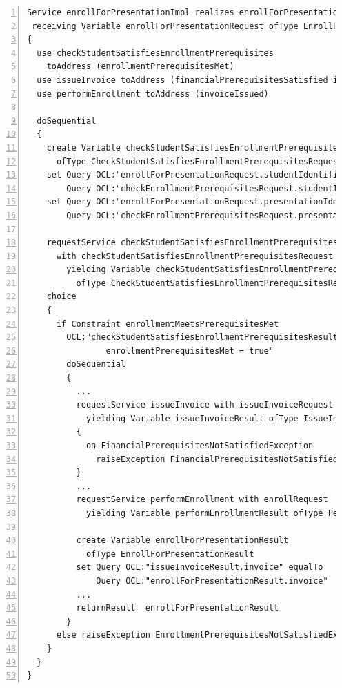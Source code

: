 \tiny \begin{lstlisting}[numbers=left,escapechar=|]
Service enrollForPresentationImpl realizes enrollForPresentation 
 receiving Variable enrollForPresentationRequest ofType EnrollForPresentationRequest
{
  use checkStudentSatisfiesEnrollmentPrerequisites 
    toAddress (enrollmentPrerequisitesMet)
  use issueInvoice toAddress (financialPrerequisitesSatisfied invoiceIssued) 
  use performEnrollment toAddress (invoiceIssued)
   
  doSequential
  {
    create Variable checkStudentSatisfiesEnrollmentPrerequisitesRequest 
      ofType CheckStudentSatisfiesEnrollmentPrerequisitesRequest               
    set Query OCL:"enrollForPresentationRequest.studentIdentifier" equalTo 
        Query OCL:"checkEnrollmentPrerequisitesRequest.studentIdentifier"
    set Query OCL:"enrollForPresentationRequest.presentationIdentifier" equalTo
        Query OCL:"checkEnrollmentPrerequisitesRequest.presentationIdentifier"
                     
    requestService checkStudentSatisfiesEnrollmentPrerequisites 
      with checkStudentSatisfiesEnrollmentPrerequisitesRequest 
        yielding Variable checkStudentSatisfiesEnrollmentPrerequisitesResult
          ofType CheckStudentSatisfiesEnrollmentPrerequisitesResult
    choice
    {
      if Constraint enrollmentMeetsPrerequisitesMet 
        OCL:"checkStudentSatisfiesEnrollmentPrerequisitesResult.
                enrollmentPrerequisitesMet = true"
        doSequential
        {
          ...
          requestService issueInvoice with issueInvoiceRequest 
            yielding Variable issueInvoiceResult ofType IssueInvoiceResult
          {
            on FinancialPrerequisitesNotSatisfiedException 
              raiseException FinancialPrerequisitesNotSatisfiedException
          }
	      ...
          requestService performEnrollment with enrollRequest 
            yielding Variable performEnrollmentResult ofType PerformEnrollmentResult
          
          create Variable enrollForPresentationResult 
            ofType EnrollForPresentationResult
          set Query OCL:"issueInvoiceResult.invoice" equalTo
              Query OCL:"enrollForPresentationResult.invoice"
          ...                       
          returnResult  enrollForPresentationResult
        }
      else raiseException EnrollmentPrerequisitesNotSatisfiedException
    }
  }
}                 
\end{lstlisting}\normalsize

 
